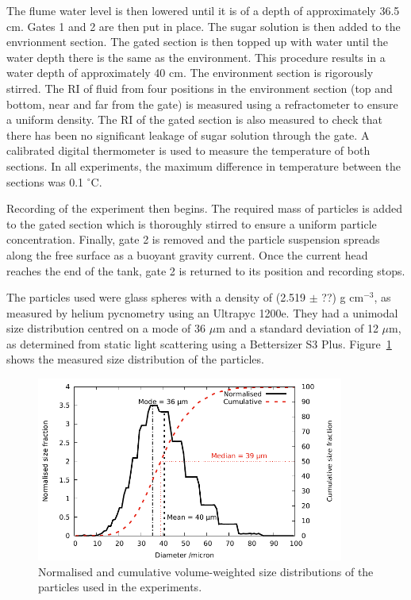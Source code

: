 \documentclass[authoryear,preprint,review,12pt]{elsarticle}
\begin{document}
The flume water level is then lowered until it is of a depth of approximately 36.5 cm. Gates 1 and 2 are then put in place. The sugar solution is then added to the envrionment section. The gated section is then topped up with water until the water depth there is the same as the environment. This procedure results in a water depth of approximately 40 cm. The environment section is rigorously stirred. The RI of fluid from four positions in the environment section (top and bottom, near and far from the gate) is measured using a refractometer to ensure a uniform density. The RI of the gated section is also measured to check that there has been no significant leakage of sugar solution through the gate. A calibrated digital thermometer is used to measure the temperature of both sections. In all experiments, the maximum difference in temperature between the sections was 0.1 $^{\circ}$C.

Recording of the experiment then begins. The required mass of particles is added to the gated section which is thoroughly stirred to ensure a uniform particle concentration. Finally, gate 2 is removed and the particle suspension spreads along the free surface as a buoyant gravity current. Once the current head reaches the end of the tank, gate 2 is returned to its position and recording stops. 

The particles used were glass spheres with a density of (2.519 $\pm$ ??) g cm$^{-3}$, as measured by helium pycnometry using an Ultrapyc 1200e. They had a unimodal size distribution centred on a mode of 36 $\mu$m and a standard deviation of 12 $\mu$m, as determined from static light scattering using a Bettersizer S3 Plus. Figure~\ref{fig:size_dist} shows the measured size distribution of the particles. 

\begin{figure}[ht!]
  \centerline{\includegraphics[width=0.9\textwidth]{unsieved_dist.pdf}}
  \caption{Normalised and cumulative volume-weighted size distributions of the particles used in the experiments.}
  \label{fig:size_dist}
\end{figure}
\end{document}

